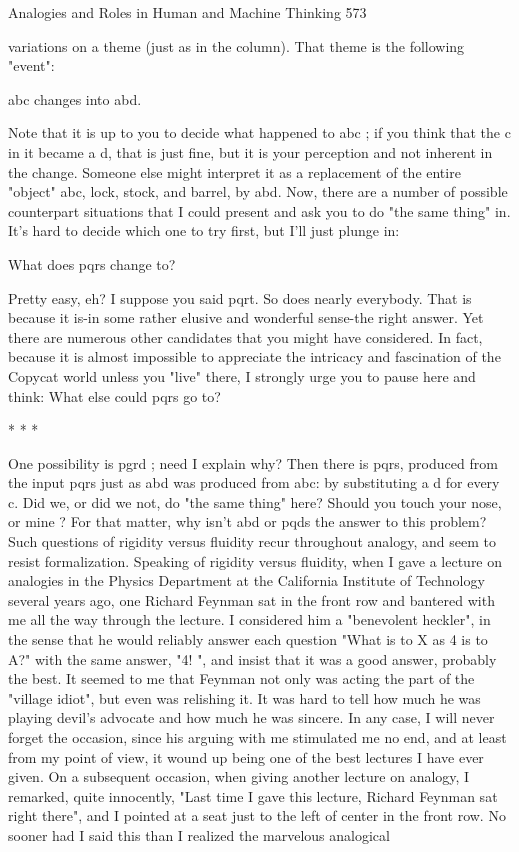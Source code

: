 Analogies and Roles in Human and Machine Thinking                                      573

variations on a theme (just as in the column). That theme is the following "event":

               abc changes into abd.

Note that it is up to you to decide what happened to abc ; if you think that the c in it
became a d, that is just fine, but it is your perception and not inherent in the change.
Someone else might interpret it as a replacement of the entire "object" abc, lock,
stock, and barrel, by abd.
        Now, there are a number of possible counterpart situations that I could present
and ask you to do "the same thing" in. It's hard to decide which one to try first, but I'll
just plunge in:

               What does pqrs change to?

Pretty easy, eh? I suppose you said pqrt. So does nearly everybody. That is because it
is-in some rather elusive and wonderful sense-the right answer. Yet there are
numerous other candidates that you might have considered. In fact, because it is
almost impossible to appreciate the intricacy and fascination of the Copycat world
unless you "live" there, I strongly urge you to pause here and think: What else could
pqrs go to?

                                        *   *   *

         One possibility is pgrd ; need I explain why? Then there is pqrs, produced
from the input pqrs just as abd was produced from abc: by substituting a d for every c.
Did we, or did we not, do "the same thing" here? Should you touch your nose, or mine
? For that matter, why isn't abd or pqds the answer to this problem? Such questions of
rigidity versus fluidity recur throughout analogy, and seem to resist formalization.
         Speaking of rigidity versus fluidity, when I gave a lecture on analogies in the
Physics Department at the California Institute of Technology several years ago, one
Richard Feynman sat in the front row and bantered with me all the way through the
lecture. I considered him a "benevolent heckler", in the sense that he would reliably
answer each question "What is to X as 4 is to A?" with the same answer, "4! ", and
insist that it was a good answer, probably the best. It seemed to me that Feynman not
only was acting the part of the "village idiot", but even was relishing it. It was hard to
tell how much he was playing devil's advocate and how much he was sincere. In any
case, I will never forget the occasion, since his arguing with me stimulated me no end,
and at least from my point of view, it wound up being one of the best lectures I have
ever given.
         On a subsequent occasion, when giving another lecture on analogy, I
remarked, quite innocently, "Last time I gave this lecture, Richard Feynman sat right
there", and I pointed at a seat just to the left of center in the front row. No sooner had
I said this than I realized the marvelous analogical




